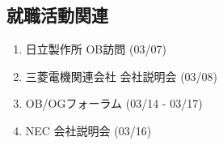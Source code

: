 \documentclass[fleqn, 12pt]{extarticle}
\begin{document}
    \subsection{就職活動関連}
    \label{sec2-3}
    \begin{enumerate}

        \item 日立製作所 OB訪問
            \hfill
            \label{enum-univ1}
            (03/07)

        \item 三菱電機関連会社 会社説明会
            \hfill
            \label{enum-univ1}
            (03/08)

        \item OB/OGフォーラム
            \hfill
            \label{enum-univ1}
            (03/14 - 03/17)

        \item NEC 会社説明会
            \hfill
            \label{enum-univ1}
            (03/16)

    \end{enumerate}

    
\end{document}
